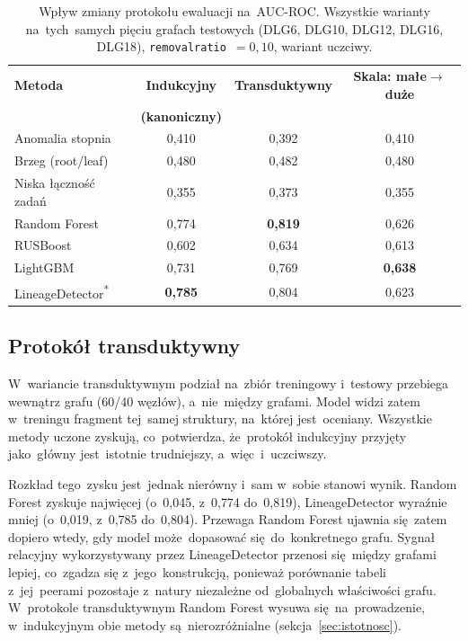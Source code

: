 \documentclass[polish,master,a4paper,oneside]{ppfcmthesis}
\renewcommand{\_}{\origtextunderscore\ifmmode\else\allowbreak\fi}
\begin{document}
\begin{table}[ht]
\centering
\caption[Wpływ zmiany protokołu ewaluacji na~AUC-ROC]{Wpływ zmiany protokołu ewaluacji na~AUC-ROC. Wszystkie warianty
na~tych~samych pięciu grafach testowych (DLG6, DLG10, DLG12, DLG16, DLG18),
\texttt{removal\_ratio}~$=0{,}10$, wariant uczciwy.}
\label{tab:warianty-protokolu}
\small
\begin{tabular}{lccc}
\toprule
\textbf{Metoda} & \textbf{Indukcyjny} & \textbf{Transduktywny} &
\textbf{Skala: małe$\to$duże} \\
 & \textbf{(kanoniczny)} & & \\
\midrule
Anomalia stopnia      & 0{,}410 & 0{,}392 & 0{,}410 \\
Brzeg (root/leaf)     & 0{,}480 & 0{,}482 & 0{,}480 \\
Niska łączność zadań  & 0{,}355 & 0{,}373 & 0{,}355 \\
\midrule
Random Forest         & 0{,}774 & \textbf{0{,}819} & 0{,}626 \\
RUSBoost              & 0{,}602 & 0{,}634 & 0{,}613 \\
LightGBM              & 0{,}731 & 0{,}769 & \textbf{0{,}638} \\
LineageDetector\textsuperscript{*} & \textbf{0{,}785} & 0{,}804 & 0{,}623 \\
\bottomrule
\end{tabular}
\end{table}

\subsection{Protokół transduktywny}

W~wariancie transduktywnym podział na~zbiór treningowy i~testowy przebiega
wewnątrz grafu (60/40 węzłów), a~nie~między grafami. Model widzi
zatem w~treningu fragment tej~samej struktury, na~której jest~oceniany.
Wszystkie metody uczone zyskują, co~potwierdza, że~protokół indukcyjny
przyjęty jako~główny jest~istotnie trudniejszy, a~więc~i~uczciwszy.

Rozkład tego~zysku jest~jednak nierówny i~sam w~sobie stanowi wynik.
Random Forest zyskuje najwięcej (o~0{,}045, z~0{,}774 do~0{,}819),
LineageDetector wyraźnie mniej (o~0{,}019, z~0{,}785 do~0{,}804). Przewaga
Random Forest ujawnia się~zatem dopiero wtedy, gdy model może~dopasować
się~do~konkretnego grafu. Sygnał relacyjny wykorzystywany przez
LineageDetector przenosi się~między grafami lepiej, co~zgadza się
z~jego~konstrukcją, ponieważ porównanie tabeli z~jej~peerami pozostaje z~natury
niezależne od~globalnych właściwości grafu. W~protokole transduktywnym
Random Forest wysuwa się~na~prowadzenie, w~indukcyjnym obie metody
są~nierozróżnialne (sekcja~\ref{sec:istotnosc}).
\end{document}
